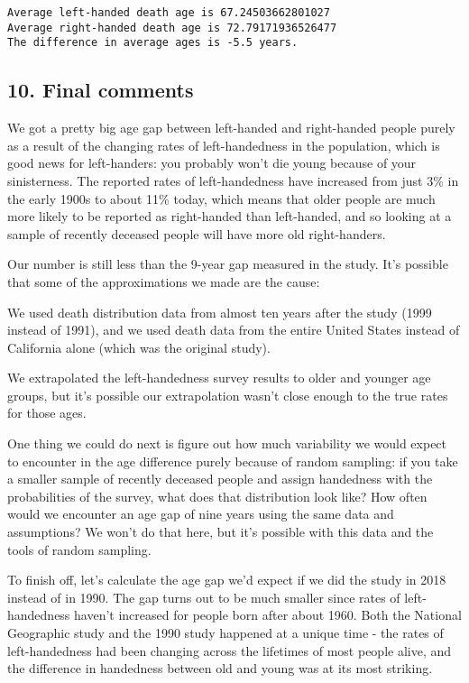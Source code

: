 \documentclass[11pt]{article}
\begin{document}
    \begin{Verbatim}[commandchars=\\\{\}]
Average left-handed death age is 67.24503662801027
Average right-handed death age is 72.79171936526477
The difference in average ages is -5.5 years.

    \end{Verbatim}

    \subsection{10. Final comments}\label{final-comments}

We got a pretty big age gap between left-handed and right-handed people
purely as a result of the changing rates of left-handedness in the
population, which is good news for left-handers: you probably won't die
young because of your sinisterness. The reported rates of
left-handedness have increased from just 3\% in the early 1900s to about
11\% today, which means that older people are much more likely to be
reported as right-handed than left-handed, and so looking at a sample of
recently deceased people will have more old right-handers.

Our number is still less than the 9-year gap measured in the study. It's
possible that some of the approximations we made are the cause:

We used death distribution data from almost ten years after the study
(1999 instead of 1991), and we used death data from the entire United
States instead of California alone (which was the original study).

We extrapolated the left-handedness survey results to older and younger
age groups, but it's possible our extrapolation wasn't close enough to
the true rates for those ages.

One thing we could do next is figure out how much variability we would
expect to encounter in the age difference purely because of random
sampling: if you take a smaller sample of recently deceased people and
assign handedness with the probabilities of the survey, what does that
distribution look like? How often would we encounter an age gap of nine
years using the same data and assumptions? We won't do that here, but
it's possible with this data and the tools of random sampling.

To finish off, let's calculate the age gap we'd expect if we did the
study in 2018 instead of in 1990. The gap turns out to be much smaller
since rates of left-handedness haven't increased for people born after
about 1960. Both the National Geographic study and the 1990 study
happened at a unique time - the rates of left-handedness had been
changing across the lifetimes of most people alive, and the difference
in handedness between old and young was at its most striking.
\end{document}

